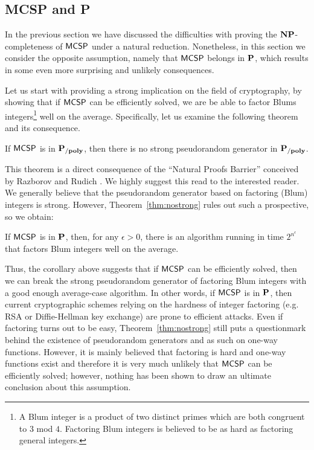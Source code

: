 \documentclass[11pt]{article}
\begin{document}
\subsection{MCSP and P}
\label{subsect:MCSP-P}
In the previous section we have discussed the difficulties with proving
the $\NP$-completeness of $\mathprob{MCSP}$ under a natural reduction.
Nonetheless, in this section we consider the opposite assumption, namely that $\mathprob{MCSP}$ belongs in $\P$, which results in some even more surprising
and unlikely consequences.

Let us start with providing a strong implication on the field of cryptography,
by showing that
if $\mathprob{MCSP}$ can be efficiently solved, we are be able to factor Blums
integers\footnote{A Blum integer is a product of two distinct primes which are both congruent to $3$ mod $4$. Factoring Blum integers is believed to be as hard as factoring general integers.}
well on the average.
Specifically, let us examine the following theorem and its consequence.

\begin{theorem}
  \label{thm:nostrong}
	If $\mathprob{MCSP}$ is in $\Ppoly$, then there is no strong pseudorandom generator in $\Ppoly$.
\end{theorem}

This theorem is a direct consequence of the ``Natural Proofs Barrier''
conceived by Razborov and Rudich \cite{10.1006/jcss.1997.1494}.
We highly suggest this read to the interested reader.
%
We generally believe that the pseudorandom generator based on factoring (Blum)
integers is strong.
However, Theorem~\ref{thm:nostrong} rules out such a prospective, so we obtain:

\begin{corollary}
	If $\mathprob{MCSP}$ is in $\P$, then, for any $\epsilon > 0$, there is an algorithm running in time $2^{n^{\epsilon}}$ that factors Blum integers well on the average.
\end{corollary}

Thus, the corollary above suggests that if $\mathprob{MCSP}$ can be efficiently
solved, then we can break the strong pseudorandom generator of factoring Blum
integers with a good enough average-case algorithm.
%
In other words, if $\mathprob{MCSP}$ is in $\P$, then current
cryptographic schemes relying on the hardness of integer factoring
(e.g. RSA or Diffie-Hellman key exchange) are prone to efficient
attacks.
%
Even if factoring turns out to be easy, Theorem~\ref{thm:nostrong} still puts a
questionmark behind the existence of pseudorandom generators and as such
on one-way functions.
%
However,
it is mainly believed that factoring is hard
and one-way functions exist
and therefore it is very much unlikely that $\mathprob{MCSP}$ can be efficiently
solved; however, nothing has been shown to draw an ultimate conclusion about
this assumption.
\end{document}
